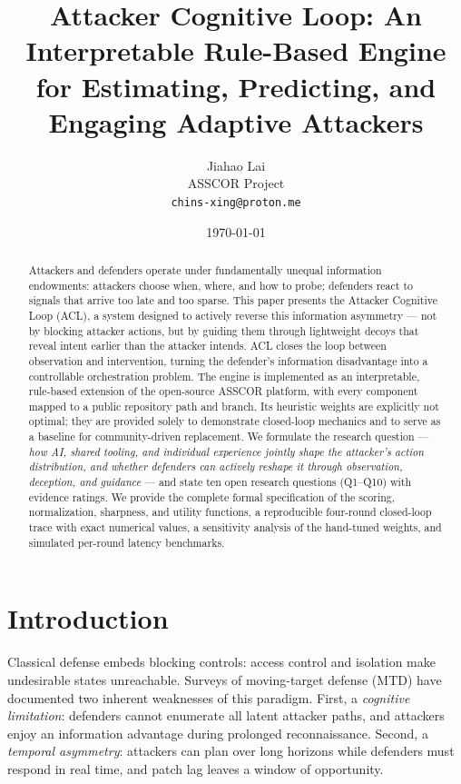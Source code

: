 \documentclass[11pt]{article}
\title{\bfseries Attacker Cognitive Loop: An Interpretable Rule-Based Engine for Estimating, Predicting, and Engaging Adaptive Attackers}
\author{Jiahao Lai \\
  \small ASSCOR Project \\
  \small \texttt{chins-xing@proton.me}}
\date{\today}
\begin{document}
\maketitle

\begin{abstract}
Attackers and defenders operate under fundamentally unequal information endowments: attackers choose when, where, and how to probe; defenders react to signals that arrive too late and too sparse. This paper presents the Attacker Cognitive Loop (ACL), a system designed to actively reverse this information asymmetry --- not by blocking attacker actions, but by guiding them through lightweight decoys that reveal intent earlier than the attacker intends. ACL closes the loop between observation and intervention, turning the defender's information disadvantage into a controllable orchestration problem. The engine is implemented as an interpretable, rule-based extension of the open-source ASSCOR platform, with every component mapped to a public repository path and branch. Its heuristic weights are explicitly not optimal; they are provided solely to demonstrate closed-loop mechanics and to serve as a baseline for community-driven replacement. We formulate the research question --- \textit{how AI, shared tooling, and individual experience jointly shape the attacker's action distribution, and whether defenders can actively reshape it through observation, deception, and guidance} --- and state ten open research questions (Q1--Q10) with evidence ratings. We provide the complete formal specification of the scoring, normalization, sharpness, and utility functions, a reproducible four-round closed-loop trace with exact numerical values, a sensitivity analysis of the hand-tuned weights, and simulated per-round latency benchmarks.
\end{abstract}

\section{Introduction}
\label{sec:intro}

Classical defense embeds blocking controls: access control and isolation make
undesirable states unreachable. Surveys of moving-target defense (MTD) have
documented two inherent weaknesses of this paradigm. First, a
\textit{cognitive limitation}: defenders cannot enumerate all latent attacker
paths, and attackers enjoy an information advantage during prolonged
reconnaissance. Second, a \textit{temporal asymmetry}: attackers can plan
over long horizons while defenders must respond in real time, and patch lag
leaves a window of opportunity.
\end{document}
